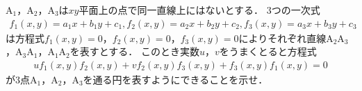 \documentclass[../../main.tex]{subfiles}
\begin{document}
$\mathrm{A}_1$，$\mathrm{A}_2$，$\mathrm{A}_3$は$xy$平面上の点で同一直線上にはないとする．
$3$つの一次式
\begin{align*}
  f_1(x,y)=a_1x+b_1y+c_1, f_2(x,y)=a_2x+b_2y+c_2, f_3(x,y)=a_3x+b_3y+c_3
\end{align*}
は方程式$f_1(x,y)=0$，$f_2(x,y)=0$，$f_3(x,y)=0$によりそれぞれ直線$\mathrm{A_2A_3}$，$\mathrm{A_3A_1}$，$\mathrm{A_1A_2}$を表すとする．
このとき実数$u$，$v$をうまくとると方程式
\begin{align*}
  uf_1(x,y)f_2(x,y)+vf_2(x,y)f_3(x,y)+f_3(x,y)f_1(x,y)=0
\end{align*}
が$3$点$\mathrm{A}_1$，$\mathrm{A}_2$，$\mathrm{A}_3$を通る円を表すようにできることを示せ．
\end{document}
